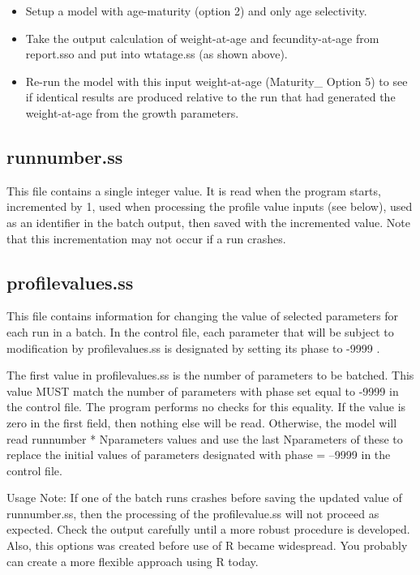 		\begin{itemize}
			\item Setup a model with age-maturity (option 2) and only age selectivity.
			\item Take the output calculation of weight-at-age and fecundity-at-age  from report.sso and put into wtatage.ss (as shown above).
			\item Re-run the model with this input weight-at-age (Maturity\_ Option 5) to see if identical results are produced relative to the run that had generated the weight-at-age from the growth parameters.
		\end{itemize}


\subsection{runnumber.ss}
This file contains a single integer value.  It is read when the program starts, incremented by 1, used when processing the profile value inputs (see below), used as an identifier in the batch output, then saved with the incremented value.  Note that this incrementation may not occur if a run crashes.

\subsection{profilevalues.ss}	
This file contains information for changing the value of selected parameters for each run in a batch.  In the control file, each parameter that will be subject to modification by profilevalues.ss is designated by setting its phase to -9999 .

The first value in profilevalues.ss is the number of parameters to be batched.  This value MUST match the number of parameters with phase set equal to -9999 in the control file.  The program performs no checks for this equality.  If the value is zero in the first field, then nothing else will be read.  Otherwise, the model will read runnumber * Nparameters values and use the last Nparameters of these to replace the initial values of parameters designated with phase = --9999 in the control file.

Usage Note: If one of the batch runs crashes before saving the updated value of runnumber.ss, then the processing of the profilevalue.ss will not proceed as expected.  Check the output carefully until a more robust procedure is developed. Also, this options was created before use of R became widespread.  You probably can create a more flexible approach using R today.


\pagebreak